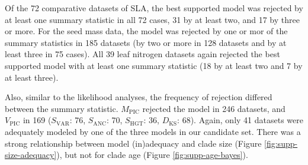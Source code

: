 \documentclass[a4paper,12pt]{article}
\begin{document}
Of the 72 comparative datasets of SLA, the best supported model was rejected by at least one summary statistic in all 72 cases, 31 by at least two, and 17 by three or more.
For the seed mass data, the model was rejected by one or mor of the summary statistics in 185 datasets (by two or more in 128 datasets and by at least three in 75 cases).
All 39 leaf nitrogen datasets again rejected the best supported model with at least one summary statistic (18 by at least two and 7 by at least three).

Also, similar to the likelihood analyses, the frequency of rejection differed between the summary statistic. $M_{\text{PIC}}$ rejected the model in 246 datasets, and $V_{\text{PIC}}$ in 169 ($S_{\text{VAR}}$: 76, $S_{\text{ANC}}$: 70, $S_{\text{HGT}}$: 36, $D_{\text{KS}}$: 68). Again, only 41 datasets were adequately modeled by one of the three models in our candidate set. There was a strong relationship between model (in)adequacy and clade size (Figure \ref{fig:supp-size-adequacy}), but not for clade age (Figure \ref{fig:supp-age-bayes}).
 

\newpage


\end{document}
